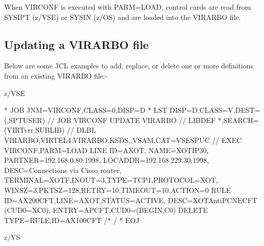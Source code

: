 \documentclass[letterpaper,10pt,english]{sphinxmanual}
\begin{document}

When VIRCONF is executed with PARM=LOAD, control cards are read from SYSIPT (z/VSE) or SYSIN (z/OS) and are loaded into the VIRARBO file.


\subsection{Updating a VIRARBO file}
\label{\detokenize{Installation_Guide:updating-a-virarbo-file}}
Below are some JCL examples to add, replace, or delete one or more definitions from an existing VIRARBO file:-

\ignorespaces 
z/VSE

\begin{sphinxVerbatim}[commandchars=\\\{\}]
* \PYGZdl{}\PYGZdl{} JOB JNM=VIRCONF,CLASS=0,DISP=D
* \PYGZdl{}\PYGZdl{} LST DISP=D,CLASS=V,DEST=(,SPTUSER)
// JOB VIRCONF UPDATE VIRARBO
// LIBDEF *,SEARCH=(VIRTvrr.SUBLIB)
// DLBL VIRARBO,\PYGZsq{}VIRTEL4.VIRARBO.KSDS\PYGZsq{},,VSAM,CAT=VSESPUC
// EXEC VIRCONF,PARM=\PYGZsq{}LOAD\PYGZsq{}
        LINE  ID=A\PYGZhy{}XOT,
              NAME=XOT\PYGZhy{}IP30,
              PARTNER=192.168.0.80:1998,
              LOCADDR=192.168.229.30:1998,
              DESC=\PYGZsq{}Connections via Cisco router\PYGZsq{},
              TERMINAL=XOTF,INOUT=3,TYPE=TCP1,PROTOCOL=XOT,
              WINSZ=3,PKTSZ=128,RETRY=10,TIMEOUT=10,ACTION=0
        RULE ID=AX200CFT,LINE=A\PYGZhy{}XOT,STATUS=ACTIVE,
              DESC=\PYGZdq{}XOT\PYGZhy{}\PYGZgt{}AntiPCNE\PYGZhy{}\PYGZgt{}CFT (CUD0=X\PYGZsq{}C0\PYGZsq{})\PYGZdq{},
              ENTRY=APCFT,CUD0=(BEGIN,C0)
        DELETE TYPE=RULE,ID=AX100CFT
/*
/\PYGZam{}
* \PYGZdl{}\PYGZdl{} EOJ
\end{sphinxVerbatim}


\ignorespaces 
z/VS
\end{document}
